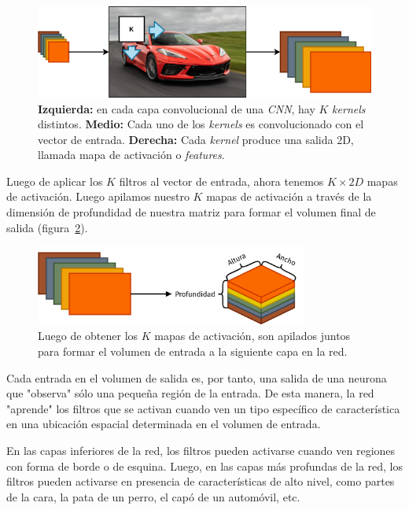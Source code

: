 \documentclass[a4paper,12pt]{article}
\begin{document}
\begin{figure}[H]
	\begin{center}				
		\includegraphics[width=1\textwidth]{feature-map-clean.png}
		\caption{\textbf{Izquierda:} en cada capa convolucional de una \textit{CNN}, hay $K$ \textit{kernels} distintos. \textbf{Medio:} Cada uno de los \textit{kernels} es convolucionado con el vector de entrada. \textbf{Derecha:} Cada \textit{kernel} produce una salida 2D, llamada mapa de activación o \textit{features}.}
		\label{fig:conv-mechanism}
	\end{center}
\end{figure}

Luego de aplicar los $K$ filtros al vector de entrada, ahora tenemos $K \times 2D$ mapas de activación. Luego apilamos nuestro $K$ mapas de activación a través de la dimensión de profundidad de nuestra matriz para formar el volumen final de salida (figura~\ref{fig:k-maps}).

\begin{figure}[H]
	\begin{center}				
		\includegraphics[width=0.8\textwidth]{k-activation-map.png}
		\caption{Luego de obtener los $K$ mapas de activación, son apilados juntos para formar el volumen de entrada a la siguiente capa en la red.}
		\label{fig:k-maps}
	\end{center}
\end{figure}

Cada entrada en el volumen de salida es, por tanto, una salida de una neurona que "observa" sólo una pequeña región de la entrada. De esta manera, la red "aprende" los filtros que se activan cuando ven un tipo específico de característica en una ubicación espacial determinada en el volumen de entrada.

En las capas inferiores de la red, los filtros pueden activarse cuando ven regiones con forma de borde o de esquina. Luego, en las capas más profundas de la red, los filtros pueden activarse en presencia de características de alto nivel, como partes de la cara, la pata de un perro, el capó de un automóvil, etc.
\end{document}
